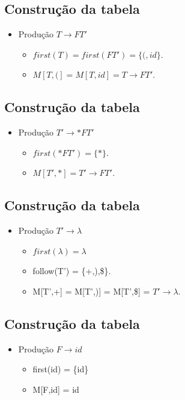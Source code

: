 \documentclass[11pt]{article}
\begin{document}
\subsection*{Construção da tabela}
\label{sec:org6cdf3a1}

\begin{itemize}
\item Produção \(T \to FT'\)
\begin{itemize}
\item \(first(T) = first(FT') = \{(,id\}\).
\item \(M[T,(] = M[T,id] = T \to FT'\).
\end{itemize}
\end{itemize}
\subsection*{Construção da tabela}
\label{sec:org3503fca}

\begin{itemize}
\item Produção \(T' \to *FT'\)
\begin{itemize}
\item \(first(*FT') =\{*\}\).
\item \(M[T',*] = T' \to FT'\).
\end{itemize}
\end{itemize}
\subsection*{Construção da tabela}
\label{sec:org1789816}

\begin{itemize}
\item Produção \(T' \to \lambda\)
\begin{itemize}
\item \(first(\lambda) = \lambda\)
\item follow(T') = \{+,),\$\}.
\item M[T',+] = M[T',)] = M[T',\$] = \(T'\to \lambda\).
\end{itemize}
\end{itemize}
\subsection*{Construção da tabela}
\label{sec:org684156c}

\begin{itemize}
\item Produção \(F \to id\)
\begin{itemize}
\item first(id) = \{id\}
\item M[F,id] = id
\end{itemize}
\end{itemize}
\end{document}
